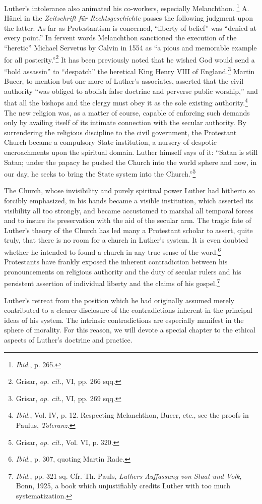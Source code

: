 Luther’s intolerance also animated his co-workers, especially Melanchthon.
\footnote{\textit{Ibid.}, p. 265.}
A. Hänel in the \textit{Zeitschrift für Rechtsgeschichte} passes
the following judgment upon the latter: As far as Protestantism is
concerned, “liberty of belief” was “denied at every point.” In fervent
words Melanchthon sanctioned the execution of the “heretic” Michael
Servetus by Calvin in 1554 as “a pious and memorable example for
all posterity.”\footnote{Grisar, \textit{op. cit.}, VI, pp. 266 sqq.}
It has been previously noted that he wished God
would send a “bold assassin” to “despatch” the heretical King Henry
VIII of England.\footnote{Grisar, \textit{op. cit.}, VI, pp. 269 sqq.}
Martin Bucer, to mention but one more of Luther’s
associates, asserted that the civil authority “was obliged to abolish
false doctrine and perverse public worship,” and that all the bishops
and the clergy must obey it as the sole existing authority.\footnote
{\textit{Ibid.}, Vol. IV, p. 12. Respecting Melanchthon, Bucer, etc., see the proofs in Paulus,
\textit{Toleranz.}}
The new religion was, as a matter of course, capable of enforcing
such demands only by availing itself of its intimate connection with
the secular authority. By surrendering the religious discipline to the
civil government, the Protestant Church became a compulsory State
institution, a nursery of despotic encroachments upon the spiritual
domain. Luther himself says of it: “Satan is still Satan; under the
papacy he pushed the Church into the world sphere and now, in our
day, he seeks to bring the State system into the Church.”\footnote{Grisar, \textit{op. cit.}, Vol. VI, p. 320.}

The Church, whose invisibility and purely spiritual power Luther
had hitherto so forcibly emphasized, in his hands became a visible institution,
which asserted its visibility all too strongly, and became
accustomed to marshal all temporal forces and to insure its preservation
with the aid of the secular arm. The tragic fate of Luther’s theory
of the Church has led many a Protestant scholar to assert, quite truly,
that there is no room for a church in Luther’s system. It is even
doubted whether he intended to found a church in any true sense of
the word.\footnote{\textit{Ibid.}, p. 307, quoting Martin Rade.}
Protestants have frankly exposed the inherent contradiction
between his pronouncements on religious authority and the duty
of secular rulers and his persistent assertion of individual liberty and
the claims of his gospel.\footnote
{\textit{Ibid.}, pp. 321 sq. Cfr. Th. Pauls, \textit{Luthers Auffassung von Staat und Volk}, Bonn, 1925,
a book which unjustifiably credits Luther with too much systematization.}

Luther’s retreat from the position which he had originally assumed
merely contributed to a clearer disclosure of the contradictions inherent
in the principal ideas of his system. The intrinsic contradictions
are especially manifest in the sphere of morality. For this reason,
we will devote a special chapter to the ethical aspects of Luther’s
doctrine and practice.
